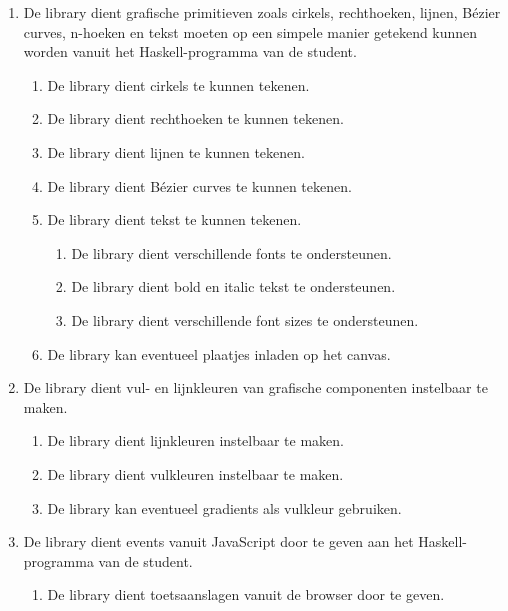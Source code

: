 \begin{enumerate}[label={R\arabic*}]
	\item \label{req:prim} De library dient grafische primitieven zoals cirkels, rechthoeken, lijnen, Bézier curves, n-hoeken en tekst moeten op een simpele manier getekend kunnen worden vanuit het Haskell-programma van de student.
	\begin{enumerate}[label={R\arabic{enumi}.\arabic*}]
		\item \label{req:circle} De library dient cirkels te kunnen tekenen.
		\item \label{req:rect} De library dient rechthoeken te kunnen tekenen.
		\item \label{req:lines} De library dient lijnen te kunnen tekenen.
		\item \label{req:bezier} De library dient Bézier curves te kunnen tekenen.
		\item \label{req:text} De library dient tekst te kunnen tekenen.
		\begin{enumerate}[label={R\arabic{enumi}.\arabic{enumii}.\arabic*}]
			\item De library dient verschillende fonts te ondersteunen.
			\item De library dient bold en italic tekst te ondersteunen.
			\item De library dient verschillende font sizes te ondersteunen.
		\end{enumerate}
		\item \label{req:pictures} De library kan eventueel plaatjes inladen op het canvas.
	\end{enumerate}
	\item De library dient vul- en lijnkleuren van grafische componenten instelbaar te maken.
	\begin{enumerate}[label={R\arabic{enumi}.\arabic*}]
		\item \label{req:colors:lines} De library dient lijnkleuren instelbaar te maken.
		\item \label{req:colors:fill} De library dient vulkleuren instelbaar te maken.
		\item \label{req:colors:fill:gradient} De library kan eventueel gradients als vulkleur gebruiken.
	\end{enumerate}
	\item De library dient events vanuit JavaScript door te geven aan het Haskell-programma van de student.
	\begin{enumerate}[label={R\arabic{enumi}.\arabic*}]
		\item \label{req:event:key} De library dient toetsaanslagen vanuit de browser door te geven.

\end{enumerate}
\end{enumerate}
